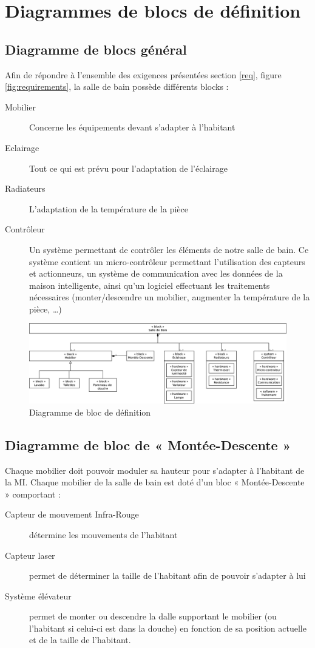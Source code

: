 \chapter{Diagrammes de blocs de définition}
\section{Diagramme de blocs général}
Afin de répondre à l'ensemble des exigences présentées section \ref{req}, figure \ref{fig:requirements}, la salle de bain possède différents blocks : 
\begin{description}
	\item[Mobilier] Concerne les équipements devant s'adapter à l'habitant
	\item[Eclairage] Tout ce qui est prévu pour l'adaptation de l'éclairage 
	\item[Radiateurs] L'adaptation de la température de la pièce
	\item[Contrôleur] Un système permettant de contrôler les éléments de notre salle de bain. Ce système contient un micro-contrôleur permettant l'utilisation des capteurs et actionneurs, un système de
		communication avec les données de la maison intelligente, ainsi qu'un logiciel effectuant les traitements nécessaires (monter/descendre un mobilier, augmenter la température de la pièce,
		\ldots)
\end{description}

\begin{figure}[H]
	\centering
	\includegraphics[width=1\linewidth]{diagrams/bathroom/diagramme_blocks_bdd.eps}
	\caption{Diagramme de bloc de définition}
	\label{fig:diagramme_bdd}
\end{figure}

\section{Diagramme de bloc de « Montée-Descente »}
Chaque mobilier doit pouvoir moduler sa hauteur pour s'adapter à l'habitant de la MI. Chaque mobilier de la salle de bain est doté d'un bloc « Montée-Descente » comportant :
\begin{description}
	\item[Capteur de mouvement Infra-Rouge] détermine les mouvements de l'habitant
	\item[Capteur laser] permet de déterminer la taille de l'habitant afin de pouvoir s'adapter à lui
	\item[Système élévateur] permet de monter ou descendre la dalle supportant le mobilier (ou l'habitant si celui-ci est dans la douche) en fonction de sa position actuelle et de la taille de l'habitant.   
\end{description}

